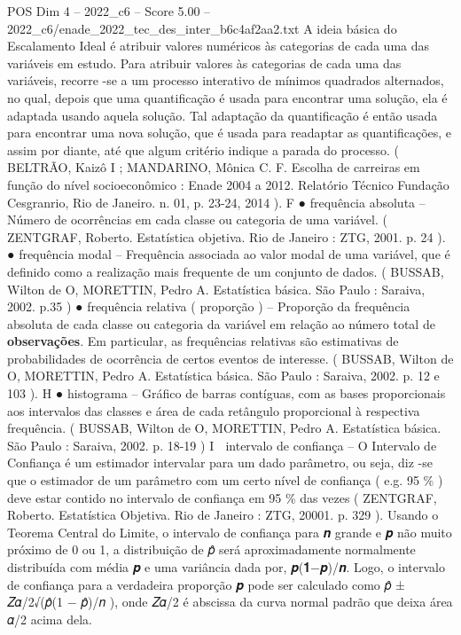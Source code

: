\begin{textsample}{POS Dim 4 – 2022\_c6 – Score 5.00 – 2022\_c6/enade\_2022\_tec\_des\_inter\_b6c4af2aa2.txt}
A ideia básica do Escalamento Ideal é atribuir valores numéricos às categorias de cada uma das variáveis em estudo.
Para atribuir valores às categorias de cada uma das variáveis, recorre -se a um processo interativo de mínimos quadrados alternados, no qual, depois que uma quantificação é usada para encontrar uma solução, ela é adaptada usando aquela solução.
Tal adaptação da quantificação é então usada para encontrar uma nova solução, que é usada para readaptar as quantificações, e assim por diante, até que algum critério indique a parada do processo. ( BELTRÃO, Kaizô I ; MANDARINO, Mônica C.
F.
Escolha de carreiras em função do nível socioeconômico : Enade 2004 a 2012.
Relatório Técnico Fundação Cesgranrio, Rio de Janeiro. n. 01, p. 23-24, 2014 ).
F {\EmojiFont ●} frequência absoluta – Número de ocorrências em cada classe ou categoria de uma variável. ( ZENTGRAF, Roberto.
Estatística objetiva.
Rio de Janeiro : ZTG, 2001. p. 24 ). {\EmojiFont ●} frequência modal – Frequência associada ao valor modal de uma variável, que é definido como a realização mais frequente de um conjunto de dados. ( BUSSAB, Wilton de O, MORETTIN, Pedro A.
Estatística básica.
São Paulo : Saraiva, 2002. p.35 ) {\EmojiFont ●} frequência relativa ( proporção ) – Proporção da frequência absoluta de cada classe ou categoria da variável em relação ao número total de \textbf{observações}.
Em particular, as frequências relativas são estimativas de probabilidades de ocorrência de certos eventos de interesse. ( BUSSAB, Wilton de O, MORETTIN, Pedro A.
Estatística básica.
São Paulo : Saraiva, 2002. p. 12 e 103 ).
H {\EmojiFont ●} histograma – Gráfico de barras contíguas, com as bases proporcionais aos intervalos das classes e área de cada retângulo proporcional à respectiva frequência. ( BUSSAB, Wilton de O, MORETTIN, Pedro A.
Estatística básica.
São Paulo : Saraiva, 2002. p. 18-19 ) I  intervalo de confiança – O Intervalo de Confiança é um estimador intervalar para um dado parâmetro, ou seja, diz -se que o estimador de um parâmetro com um certo nível de confiança ( e.g. 95 \% ) deve estar contido no intervalo de confiança em 95 \% das vezes ( ZENTGRAF, Roberto.
Estatística Objetiva.
Rio de Janeiro : ZTG, 20001. p. 329 ).
Usando o Teorema Central do Limite, o intervalo de confiança para 𝒏 grande e 𝒑 não muito próximo de 0 ou 1, a distribuição de 𝑝̂ será aproximadamente normalmente distribuída com média 𝒑 e uma variância dada por, 𝒑(𝟏−𝒑)/𝒏.
Logo, o intervalo de confiança para a verdadeira proporção 𝒑 pode ser calculado como 𝑝̂ ± 𝑍𝛼/2√(𝑝̂(1 − 𝑝̂)/𝑛 ), onde 𝑍𝛼/2 é abscissa da curva normal padrão que deixa área 𝛼/2 acima dela.

\end{textsample}
